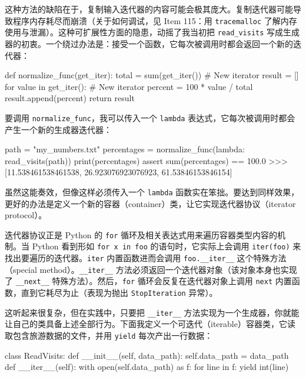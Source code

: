 这种方法的缺陷在于，复制输入迭代器的内容可能会极其庞大。复制迭代器可能导致程序内存耗尽而崩溃（关于如何调试，见 Item 115：用 \texttt{tracemalloc} 了解内存使用与泄漏）。这种可扩展性方面的隐患，动摇了我当初把 \texttt{read\_visits} 写成生成器的初衷。一个绕过办法是：接受一个函数，它每次被调用时都会返回一个新的迭代器：

\begin{codebox}[python]
def normalize_func(get_iter):
    total = sum(get_iter())   # New iterator
    result = []
    for value in get_iter():  # New iterator
        percent = 100 * value / total
        result.append(percent)
    return result
\end{codebox}

要调用 \texttt{normalize\_func}，我可以传入一个 \texttt{lambda} 表达式，它每次被调用时都会产生一个新的生成器迭代器：

\begin{codebox}[python]
path = "my_numbers.txt"
percentages = normalize_func(lambda: read_visits(path))
print(percentages)
assert sum(percentages) == 100.0
>>>
[11.538461538461538, 26.923076923076923, 61.53846153846154]
\end{codebox}

虽然这能奏效，但像这样必须传入一个 \texttt{lambda} 函数实在笨拙。要达到同样效果，更好的办法是定义一个新的容器（container）类，让它实现迭代器协议（iterator protocol）。

迭代器协议正是 Python 的 \texttt{for} 循环及相关表达式用来遍历容器类型内容的机制。当 Python 看到形如 \texttt{for x in foo} 的语句时，它实际上会调用 \texttt{iter(foo)} 来找出要遍历的迭代器。\texttt{iter} 内置函数进而会调用 \texttt{foo.\_\_iter\_\_} 这个特殊方法（special method）。\texttt{\_\_iter\_\_} 方法必须返回一个迭代器对象（该对象本身也实现了 \texttt{\_\_next\_\_} 特殊方法）。然后，\texttt{for} 循环会反复在迭代器对象上调用 \texttt{next} 内置函数，直到它耗尽为止（表现为抛出 \texttt{StopIteration} 异常）。

这听起来很复杂，但在实践中，只要把 \texttt{\_\_iter\_\_} 方法实现为一个生成器，你就能让自己的类具备上述全部行为。下面我定义一个可迭代（iterable）容器类，它读取包含旅游数据的文件，并用 \texttt{yield} 每次产出一行数据：

\begin{codebox}[python]
class ReadVisits:
    def __init__(self, data_path):
        self.data_path = data_path
    def __iter__(self):
        with open(self.data_path) as f:
            for line in f:
                yield int(line)
\end{codebox}

